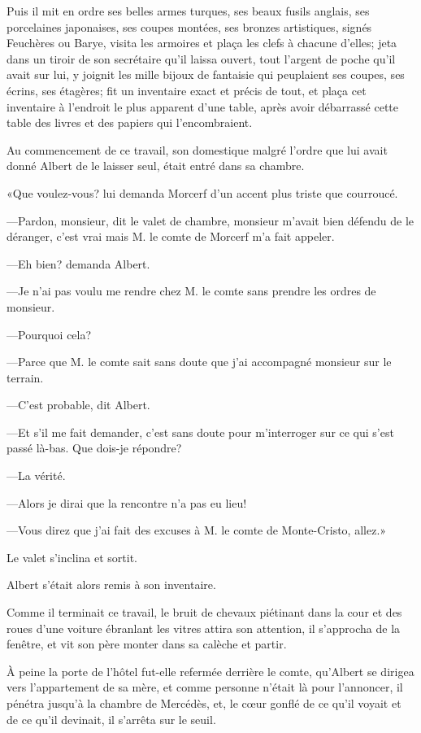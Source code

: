 Puis il mit en ordre ses belles armes turques, ses beaux fusils anglais, ses porcelaines japonaises, ses coupes montées, ses bronzes artistiques, signés Feuchères ou Barye, visita les armoires et plaça les clefs à chacune d'elles; jeta dans un tiroir de son secrétaire qu'il laissa ouvert, tout l'argent de poche qu'il avait sur lui, y joignit les mille bijoux de fantaisie qui peuplaient ses coupes, ses écrins, ses étagères; fit un inventaire exact et précis de tout, et plaça cet inventaire à l'endroit le plus apparent d'une table, après avoir débarrassé cette table des livres et des papiers qui l'encombraient. 

Au commencement de ce travail, son domestique malgré l'ordre que lui avait donné Albert de le laisser seul, était entré dans sa chambre. 

«Que voulez-vous? lui demanda Morcerf d'un accent plus triste que courroucé. 

—Pardon, monsieur, dit le valet de chambre, monsieur m'avait bien défendu de le déranger, c'est vrai mais M. le comte de Morcerf m'a fait appeler. 

—Eh bien? demanda Albert. 

—Je n'ai pas voulu me rendre chez M. le comte sans prendre les ordres de monsieur. 

—Pourquoi cela? 

—Parce que M. le comte sait sans doute que j'ai accompagné monsieur sur le terrain. 

—C'est probable, dit Albert. 

—Et s'il me fait demander, c'est sans doute pour m'interroger sur ce qui s'est passé là-bas. Que dois-je répondre? 

—La vérité. 

—Alors je dirai que la rencontre n'a pas eu lieu! 

—Vous direz que j'ai fait des excuses à M. le comte de Monte-Cristo, allez.» 

Le valet s'inclina et sortit. 

Albert s'était alors remis à son inventaire. 

Comme il terminait ce travail, le bruit de chevaux piétinant dans la cour et des roues d'une voiture ébranlant les vitres attira son attention, il s'approcha de la fenêtre, et vit son père monter dans sa calèche et partir. 

À peine la porte de l'hôtel fut-elle refermée derrière le comte, qu'Albert se dirigea vers l'appartement de sa mère, et comme personne n'était là pour l'annoncer, il pénétra jusqu'à la chambre de Mercédès, et, le cœur gonflé de ce qu'il voyait et de ce qu'il devinait, il s'arrêta sur le seuil. 

